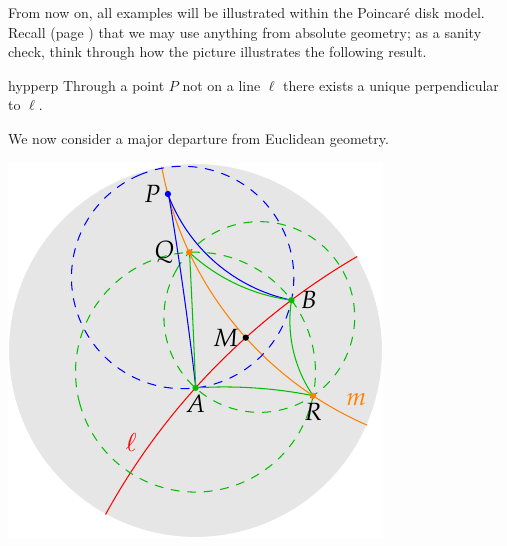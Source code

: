 \begin{minipage}[t]{0.65\linewidth}\vspace{-8pt}
From now on, all examples will be illustrated within the Poincaré disk model. Recall (page \pageref{sec:hyp1}) that we may use anything from absolute geometry; as a sanity check, think through how the picture illustrates the following result.

\begin{lemm}{}{hypperp}
Through a point $P$ not on a line $\ell$ there exists a unique perpendicular to $\ell$. 
\end{lemm}


We now consider a major departure from Euclidean geometry.
\end{minipage}\hfill\begin{minipage}[t]{0.34\linewidth}\vspace{-28pt}
\flushright\includegraphics[scale=0.75]{basic-perp}
\end{minipage}

